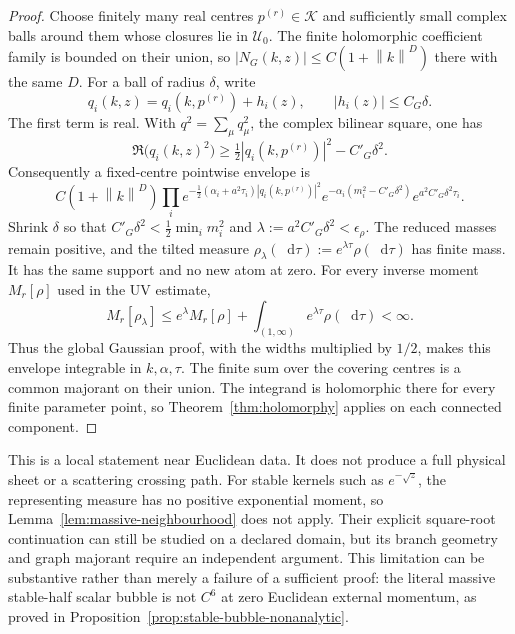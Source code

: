 \documentclass[final,5p,times,twocolumn,numbers,nopreprintline]{elsarticle}
\numberwithin{equation}{section}
\theoremstyle{definition}
\theoremstyle{remark}
\newcommand{\dd}{\mathop{}\!\mathrm d}
\newcommand{\norm}[1]{\left\lVert #1\right\rVert}
\begin{document}
\begin{proof}
Choose finitely many real centres \(p^{(r)}\in\mathcal K\)
and sufficiently small complex balls around them whose closures lie
in \(\mathcal U_0\). The finite holomorphic coefficient family is
bounded on their union, so
\( |N_G(k,z)|\leq C(1+\norm{k}^{D})\) there with the same \(D\).
For a ball of radius \(\delta\), write
\[
 q_i(k,z)=q_i(k,p^{(r)})+h_i(z),\qquad
 |h_i(z)|\leq C_G\delta.
\]
The first term is real. With \(q^2=\sum_\mu q_\mu^2\),
the complex bilinear square, one has
\[
 \Re\bigl(q_i(k,z)^2\bigr)
 \geq\tfrac12|q_i(k,p^{(r)})|^2-C'_G\delta^2.
\]
Consequently a fixed-centre pointwise envelope is
\[
 C(1+\norm{k}^{D})\prod_i
 e^{-\frac12(\alpha_i+a^2\tau_i)|q_i(k,p^{(r)})|^2}
 e^{-\alpha_i(m_i^2-C'_G\delta^2)}
 e^{a^2C'_G\delta^2\tau_i}.
\]
Shrink \(\delta\) so that
\(C'_G\delta^2<\frac12\min_i m_i^2\) and
\(\lambda:=a^2C'_G\delta^2<\epsilon_\rho\).
The reduced masses remain positive, and the tilted measure
\(\rho_\lambda(\dd\tau):=e^{\lambda\tau}\rho(\dd\tau)\)
has finite mass. It has the same support and no new atom at zero.
For every inverse moment \(M_r[\rho]\) used in the UV estimate,
\[
 M_r[\rho_\lambda]
 \leq e^\lambda M_r[\rho]
       +\int_{(1,\infty)}e^{\lambda\tau}\rho(\dd\tau)
 <\infty.
\]
Thus the global Gaussian proof, with the widths multiplied by
\(1/2\), makes this envelope integrable in \(k,\alpha,\tau\).
The finite sum over the covering centres is a common majorant on
their union. The integrand is holomorphic there for every finite
parameter point, so Theorem~\ref{thm:holomorphy} applies on each
connected component.
\end{proof}

This is a local statement near Euclidean data. It does not produce
a full physical sheet or a scattering crossing path.
For stable kernels such as \(e^{-\sqrt z}\), the representing
measure has no positive exponential moment, so
Lemma~\ref{lem:massive-neighbourhood} does not apply. Their explicit
square-root continuation can still be studied on a declared
domain, but its branch geometry and graph majorant require an
independent argument. This limitation can be substantive rather
than merely a failure of a sufficient proof: the literal massive
stable-half scalar bubble is not \(C^6\) at zero Euclidean
external momentum, as proved in
Proposition~\ref{prop:stable-bubble-nonanalytic}.
\end{document}
